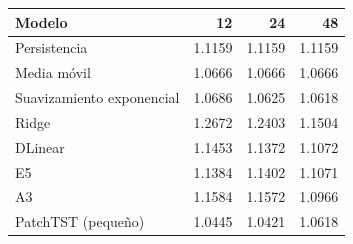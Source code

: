 \begin{tabular}{lrrr}
\toprule
Modelo & 12 & 24 & 48 \\
\midrule
Persistencia & 1.1159 & 1.1159 & 1.1159 \\
Media móvil & 1.0666 & 1.0666 & 1.0666 \\
Suavizamiento exponencial & 1.0686 & 1.0625 & 1.0618 \\
Ridge & 1.2672 & 1.2403 & 1.1504 \\
DLinear & 1.1453 & 1.1372 & 1.1072 \\
E5 & 1.1384 & 1.1402 & 1.1071 \\
A3 & 1.1584 & 1.1572 & 1.0966 \\
PatchTST (pequeño) & 1.0445 & 1.0421 & 1.0618 \\
\bottomrule
\end{tabular}
